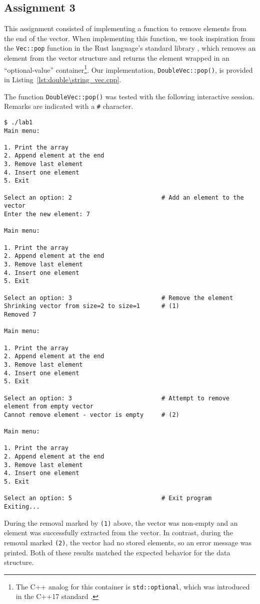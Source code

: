 \documentclass[11pt, letterpaper]{article} %
\begin{document}
\subsection*{Assignment 3} 
This assignment consisted of implementing a function to remove elements from the end of the vector. When implementing this function, we took inspiration from the \texttt{Vec::pop} function in the Rust language's standard library \cite{rust-vec}, which removes an element from the vector structure and returns the element wrapped in an ``optional-value'' container\footnote{The C++ analog for this container is \texttt{std::optional}, which was introduced in the C++17 standard \cite{cppreference-optional}.}. Our implementation, \texttt{DoubleVec::pop()}, is provided in Listing~\ref{lst:double\string_vec.cpp}.

The function \texttt{DoubleVec::pop()} was tested with the following interactive session. Remarks are indicated with a \texttt{\#} character.
\begin{lstlisting}[style=labreportstyle-sh]
$ ./lab1
Main menu:

1. Print the array
2. Append element at the end
3. Remove last element
4. Insert one element
5. Exit

Select an option: 2                         # Add an element to the vector
Enter the new element: 7

Main menu:

1. Print the array
2. Append element at the end
3. Remove last element
4. Insert one element
5. Exit

Select an option: 3                         # Remove the element
Shrinking vector from size=2 to size=1      # (1)
Removed 7

Main menu:

1. Print the array
2. Append element at the end
3. Remove last element
4. Insert one element
5. Exit

Select an option: 3                         # Attempt to remove element from empty vector
Cannot remove element - vector is empty     # (2)

Main menu:

1. Print the array
2. Append element at the end
3. Remove last element
4. Insert one element
5. Exit

Select an option: 5                         # Exit program
Exiting...
\end{lstlisting}

During the removal marked by \texttt{(1)} above, the vector was non-empty and an element was successfully extracted from the vector. In contrast, during the removal marked \texttt{(2)}, the vector had no stored elements, so an error message was printed. Both of these results matched the expected behavior for the data structure.
\end{document}
